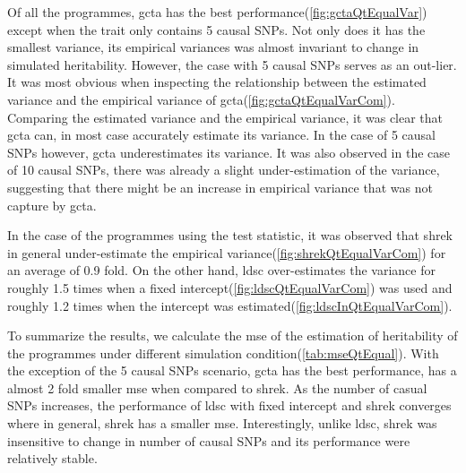 		Of all the programmes, \gls{gcta} has the best performance(\cref{fig:gctaQtEqualVar}) except when the trait only contains 5 causal \glspl{SNP}. 
		Not only does it has the smallest variance, its empirical variances was almost invariant to change in simulated heritability.
		However, the case with 5 causal \glspl{SNP} serves as an out-lier. 
		It was most obvious when inspecting the relationship between the estimated variance and the empirical variance of \gls{gcta}(\cref{fig:gctaQtEqualVarCom}).
		Comparing the estimated variance and the empirical variance, it was clear that \gls{gcta} can, in most case accurately estimate its variance. 
		In the case of 5 causal \glspl{SNP} however, \gls{gcta} underestimates its variance.
		It was also observed in the case of 10 causal \glspl{SNP}, there was already a slight under-estimation of the variance, suggesting that there might be an increase in empirical variance that was not capture by \gls{gcta}.
		
		In the case of the programmes using the test statistic, it was observed that \gls{shrek} in general under-estimate the empirical variance(\cref{fig:shrekQtEqualVarCom}) for an average of 0.9 fold. 
		On the other hand, \gls{ldsc} over-estimates the variance for roughly 1.5 times when a fixed intercept(\cref{fig:ldscQtEqualVarCom}) was used and roughly 1.2 times when the intercept was estimated(\cref{fig:ldscInQtEqualVarCom}). 
		
		To summarize the results, we calculate the \gls{mse} of the estimation of heritability of the programmes under different simulation condition(\cref{tab:mseQtEqual}). 
		With the exception of the 5 causal \glspl{SNP} scenario, \gls{gcta} has the best performance, has a almost 2 fold smaller \gls{mse} when compared to \gls{shrek}.
		As the number of casual \glspl{SNP} increases, the performance of \gls{ldsc} with fixed intercept and \gls{shrek} converges where in general, \gls{shrek} has a smaller \gls{mse}.
		Interestingly, unlike \gls{ldsc}, \gls{shrek} was insensitive to change in number of causal \glspl{SNP} and its performance were relatively stable.
		

